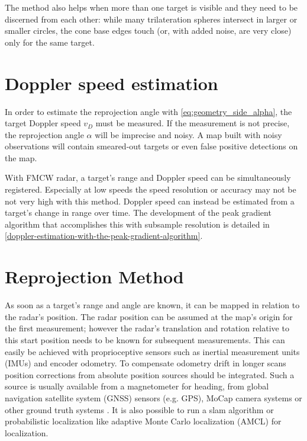 The method also helps when more than one target is visible and they need to be discerned from each other: while many trilateration spheres intersect in larger or smaller circles, the cone base edges touch (or, with added noise, are very close) only for the same target.

\section{Doppler speed estimation}\label{doppler-speed-estimation}

In order to estimate the reprojection angle with \cref{eq:geometry_side_alpha}, the target Doppler speed $v_D$ must be measured. If the measurement is not precise, the reprojection angle \(\alpha\) will be imprecise and noisy. A map built with noisy observations will contain smeared-out targets or even false positive detections on the map.

With FMCW radar, a target's range and Doppler speed can be simultaneously registered. Especially at low speeds the speed resolution or accuracy may not be not very high with this method. Doppler speed can instead be estimated from a target's change in range over time. The development of the peak gradient algorithm that accomplishes this with subsample resolution is detailed in \cref{doppler-estimation-with-the-peak-gradient-algorithm}.

\section{Reprojection Method}\label{reprojection-method}

As soon as a target's range and angle are known, it can be mapped in relation
to the radar's position. The radar position can be assumed at the map's origin for the first measurement; however the radar's translation and rotation relative to this start position needs to be known for subsequent measurements. This can easily be achieved with proprioceptive sensors such as inertial measurement units (IMUs) and encoder odometry. To compensate odometry drift in longer scans position corrections from absolute position sources should be integrated. Such a source is usually available from a magnetometer for heading, from global navigation satellite system (GNSS) sensors (e.g. GPS), MoCap camera systems or other ground truth systems \cite{Godil2013}. It is also possible to run a slam algorithm or probabilistic localization like adaptive Monte Carlo localization (AMCL) for localization.

